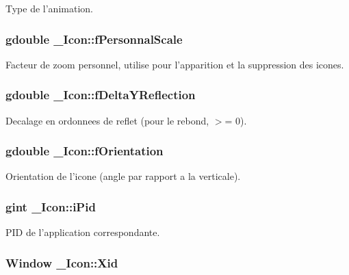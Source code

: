 Type de l'animation. 

\subsubsection{\setlength{\rightskip}{0pt plus 5cm}gdouble {\bf \_\-Icon::fPersonnalScale}}\label{struct__Icon_d82607fc388efb4d012e5a8de872f8ca}


Facteur de zoom personnel, utilise pour l'apparition et la suppression des icones. 

\subsubsection{\setlength{\rightskip}{0pt plus 5cm}gdouble {\bf \_\-Icon::fDeltaYReflection}}\label{struct__Icon_68af6b183dd833a9c1a9c7072d20522c}


Decalage en ordonnees de reflet (pour le rebond, $>$= 0). 

\subsubsection{\setlength{\rightskip}{0pt plus 5cm}gdouble {\bf \_\-Icon::fOrientation}}\label{struct__Icon_30c29ae51f620d51dcee811ebd1c8295}


Orientation de l'icone (angle par rapport a la verticale). 

\subsubsection{\setlength{\rightskip}{0pt plus 5cm}gint {\bf \_\-Icon::iPid}}\label{struct__Icon_f3b6afeb6207d6efd48f494823c4e8fa}


PID de l'application correspondante. 

\subsubsection{\setlength{\rightskip}{0pt plus 5cm}Window {\bf \_\-Icon::Xid}}\label{struct__Icon_6f21902debcba6a03a884d60fb131e2e}


